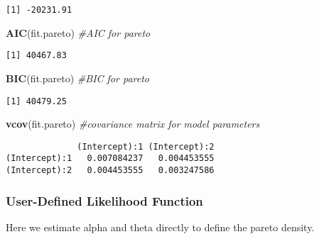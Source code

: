 \documentclass[]{book}
\newenvironment{Shaded}{\begin{snugshade}}{\end{snugshade}}
\newcommand{\KeywordTok}[1]{\textcolor[rgb]{0.13,0.29,0.53}{\textbf{#1}}}
\newcommand{\CommentTok}[1]{\textcolor[rgb]{0.56,0.35,0.01}{\textit{#1}}}
\newcommand{\NormalTok}[1]{#1}
\theoremstyle{definition}
\theoremstyle{definition}
\theoremstyle{definition}
\theoremstyle{remark}
\begin{document}
\begin{verbatim}
[1] -20231.91
\end{verbatim}

\begin{Shaded}
\begin{Highlighting}[]
\KeywordTok{AIC}\NormalTok{(fit.pareto)                  }\CommentTok{#AIC for pareto}
\end{Highlighting}
\end{Shaded}

\begin{verbatim}
[1] 40467.83
\end{verbatim}

\begin{Shaded}
\begin{Highlighting}[]
\KeywordTok{BIC}\NormalTok{(fit.pareto)                  }\CommentTok{#BIC for pareto}
\end{Highlighting}
\end{Shaded}

\begin{verbatim}
[1] 40479.25
\end{verbatim}

\begin{Shaded}
\begin{Highlighting}[]
\KeywordTok{vcov}\NormalTok{(fit.pareto)                 }\CommentTok{#covariance matrix for model parameters }
\end{Highlighting}
\end{Shaded}

\begin{verbatim}
              (Intercept):1 (Intercept):2
(Intercept):1   0.007084237   0.004453555
(Intercept):2   0.004453555   0.003247586
\end{verbatim}

\subsubsection{User-Defined Likelihood
Function}\label{user-defined-likelihood-function-1}

Here we estimate alpha and theta directly to define the pareto density.
\end{document}
